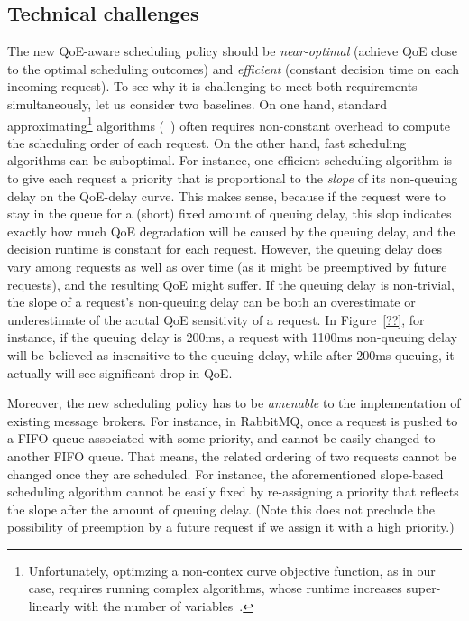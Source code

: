 \subsection{Technical challenges}

The new QoE-aware scheduling policy should be {\em near-optimal} (\ie achieve QoE close to the optimal scheduling outcomes) and {\em efficient} (\ie constant decision time on each incoming request).
To see why it is challenging to meet both requirements simultaneously, let us consider two baselines.
On one hand, standard approximating\footnote{Unfortunately, optimzing a non-contex curve objective function, as in our case, requires running complex algorithms, whose runtime increases super-linearly with the number of variables~\cite{??}.} algorithms (\eg~\cite{??}) often requires non-constant overhead to compute the scheduling order of each request. 
On the other hand, fast scheduling algorithms can be suboptimal. 
For instance, one efficient scheduling algorithm is to give each request a priority that is proportional to the {\em slope} of its non-queuing delay on the QoE-delay curve. 
This makes sense, because if the request were to stay in the queue for a (short) fixed amount of queuing delay, this slop indicates exactly how much QoE degradation will be caused by the queuing delay, and the decision runtime is constant for each request.
However, the queuing delay does vary among requests as well as over time (as it might be preemptived by future requests), and the resulting QoE might suffer.
If the queuing delay is non-trivial, the slope of a request's non-queuing delay can be both an overestimate or underestimate of the acutal QoE sensitivity of a request. 
In Figure~\ref{??}, for instance, if the queuing delay is 200ms, a request with 1100ms non-queuing delay will be believed as insensitive to the queuing delay, while after 200ms queuing, it actually will see significant drop in QoE. 

Moreover, the new scheduling policy has to be {\em amenable} to the implementation of existing message brokers. 
For instance, in RabbitMQ, once a request is pushed to a FIFO queue associated with some priority, and cannot be easily changed to another FIFO queue. 
That means, the related ordering of two requests cannot be changed once they are scheduled.
For instance, the aforementioned slope-based scheduling algorithm cannot be easily fixed by re-assigning a priority that reflects the slope after the amount of queuing delay.
(Note this does not preclude the possibility of preemption by a future request if we assign it with a high priority.)

